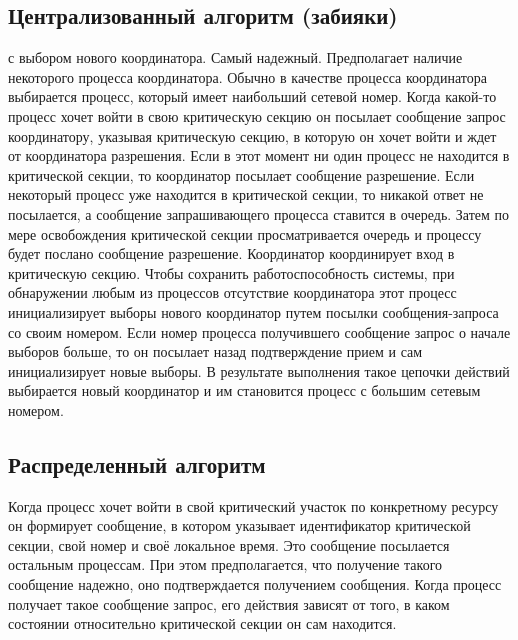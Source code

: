 \subsection{Централизованный алгоритм (забияки)}

с выбором нового координатора. Самый надежный. Предполагает наличие некоторого процесса координатора. Обычно в качестве процесса координатора выбирается процесс, который имеет наибольший сетевой номер. Когда какой-то процесс хочет войти в свою критическую секцию он посылает сообщение запрос координатору, указывая критическую секцию, в которую он хочет войти и ждет от координатора разрешения. Если в этот момент ни один процесс не находится в критической секции, то координатор посылает сообщение разрешение. Если некоторый процесс уже находится в критической секции, то никакой ответ не посылается, а сообщение запрашивающего процесса ставится в очередь. Затем по мере освобождения критической секции просматривается очередь и процессу будет послано сообщение разрешение.   Координатор координирует вход в критическую секцию. Чтобы сохранить работоспособность системы, при обнаружении любым из процессов отсутствие координатора этот процесс инициализирует выборы нового координатор путем посылки сообщения-запроса со своим номером. Если номер процесса получившего сообщение запрос о начале выборов больше, то он посылает назад подтверждение прием и сам инициализирует новые выборы. В результате выполнения такое цепочки действий выбирается новый координатор и им становится процесс с большим сетевым номером. 

\subsection{Распределенный алгоритм}

Когда процесс хочет войти в свой критический участок по конкретному ресурсу он формирует сообщение, в котором указывает идентификатор критической секции, свой номер и своё локальное время. Это сообщение посылается остальным процессам. При этом предполагается, что получение такого сообщение надежно, оно подтверждается получением сообщения. Когда процесс получает такое сообщение запрос, его действия зависят от того, в каком состоянии относительно критической секции он сам находится. 

